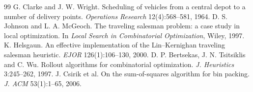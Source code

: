 \documentclass[10pt,twocolumn]{article}
\begin{document}
\begin{thebibliography}{99}
 G. Clarke and J. W. Wright. Scheduling of vehicles from a central depot to a number of delivery points. \emph{Operations Research} 12(4):568--581, 1964.
 D. S. Johnson and L. A. McGeoch. The traveling salesman problem: a case study in local optimization. In \emph{Local Search in Combinatorial Optimization}, Wiley, 1997.
 K. Helsgaun. An effective implementation of the Lin--Kernighan traveling salesman heuristic. \emph{EJOR} 126(1):106--130, 2000.
 D. P. Bertsekas, J. N. Tsitsiklis and C. Wu. Rollout algorithms for combinatorial optimization. \emph{J. Heuristics} 3:245--262, 1997.
 J. Csirik et al. On the sum-of-squares algorithm for bin packing. \emph{J. ACM} 53(1):1--65, 2006.
\end{thebibliography}
\end{document}

